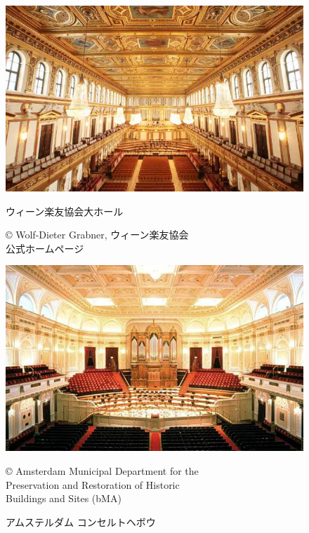 \documentclass[11pt,a4j]{jreport}
\begin{document}
\begin{figure}[H]
  \begin{minipage}[t]{0.5\linewidth}
    \centering
    \includegraphics[width=0.9\linewidth]{images/pictureCitation/resized/musikverein.jpg}
    \caption{ウィーン楽友協会大ホール}
    \footnotesize © Wolf-Dieter Grabner, ウィーン楽友協会\\公式ホームページ \cite{musikverein}
    \label{fig:ウィーン楽友協会大ホール}
  \end{minipage}%
  \begin{minipage}[t]{0.5\linewidth}
    \centering
    \includegraphics[width=0.9\linewidth]{images/pictureCitation/resized/Concertgebouw.jpg}
    \caption{アムステルダム コンセルトヘボウ}
    \label{fig:コンセルトヘボウ}
    \footnotesize © Amsterdam Municipal Department for the\\ Preservation and Restoration of Historic\\ Buildings and Sites (bMA) \cite{Concertgebouw}
  \end{minipage}
\end{figure}

\end{document}

